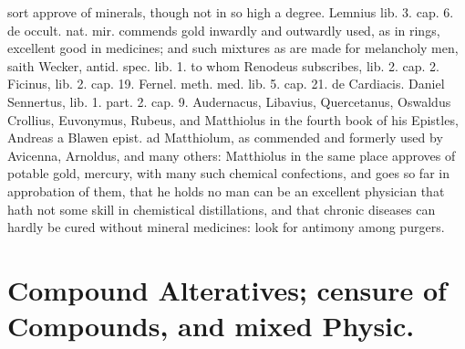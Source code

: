 {sort approve of minerals, though not in so high a degree. Lemnius lib.
3. cap. 6. de occult. nat. mir. commends gold inwardly and outwardly
used, as in rings, excellent good in medicines; and such mixtures as
are made for melancholy men, saith Wecker, antid. spec. lib. 1. to whom
Renodeus subscribes, lib. 2. cap. 2. Ficinus, lib. 2. cap. 19. Fernel.
meth. med. lib. 5. cap. 21. de Cardiacis. Daniel Sennertus, lib. 1.
part. 2. cap. 9. Audernacus, Libavius, Quercetanus, Oswaldus Crollius,
Euvonymus, Rubeus, and Matthiolus in the fourth book of his Epistles,
Andreas a Blawen epist. ad Matthiolum, as commended and formerly used
by Avicenna, Arnoldus, and many others: Matthiolus in the same
place approves of potable gold, mercury, with many such chemical
confections, and goes so far in approbation of them, that he holds
 no man can be an excellent physician that hath not some skill in
chemistical distillations, and that chronic diseases can hardly be
cured without mineral medicines: look for antimony among purgers.

\section[Compound Alteratives]{Compound Alteratives; censure of Compounds, and mixed
Physic.}

}
